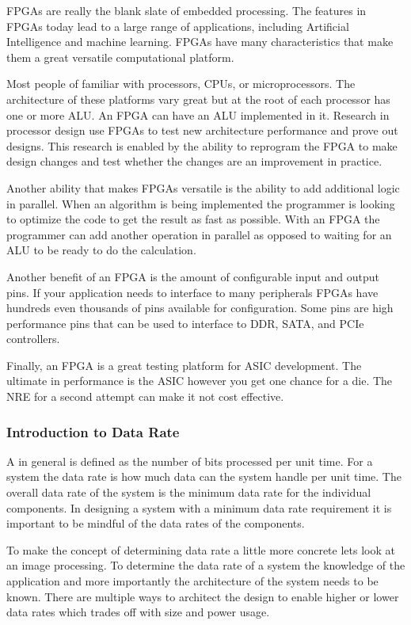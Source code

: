 \ac{FPGA}s are really the blank slate of embedded processing. The features in \ac{FPGA}s today lead to a large range of applications, including Artificial Intelligence and machine learning. \ac{FPGA}s have many characteristics that make them a great versatile computational platform. 

Most people of familiar with processors, \ac{CPU}s, or microprocessors. The architecture of these platforms vary great but at the root of each processor has one or more \ac{ALU}. An \ac{FPGA} can have an \ac{ALU} implemented in it. Research in processor design use \ac{FPGA}s to test new architecture performance and prove out designs. This research is enabled by the ability to reprogram the \ac{FPGA} to make design changes and test whether the changes are an improvement in practice. 

Another ability that makes \ac{FPGA}s versatile is the ability to add additional logic in parallel. When an algorithm is being implemented the programmer is looking to optimize the code to get the result as fast as possible. With an \ac{FPGA} the programmer can add another operation in parallel as opposed to waiting for an \ac{ALU} to be ready to do the calculation. 

Another benefit of an \ac{FPGA} is the amount of configurable input and output pins. If your application needs to interface to many peripherals \ac{FPGA}s have hundreds even thousands of pins available for configuration. Some pins are high performance pins that can be used to interface to \ac{DDR}, \ac{SATA}, and \ac{PCIe} controllers. 

Finally, an \ac{FPGA} is a great testing platform for \ac{ASIC} development. The ultimate in performance is the \ac{ASIC} however you get one chance for a die. The \ac{NRE} for a second attempt can make it not cost effective.

\subsubsection{Introduction to Data Rate}

A  in general is defined as the number of bits processed per unit time. For a system the data rate is how much data can the system handle per unit time. The overall data rate of the system is the minimum data rate for the individual components. In designing a system with a minimum data rate requirement it is important to be mindful of the data rates of the components.

To make the concept of determining data rate a little more concrete lets look at an image processing. To determine the data rate of a system the knowledge of the application and more importantly the architecture of the system needs to be known. There are multiple ways to architect the design to enable higher or lower data rates which trades off with size and power usage. 

